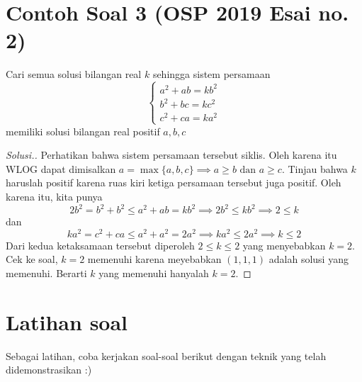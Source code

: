 \documentclass[12pt]{scrartcl}
\begin{document}
\section{Contoh Soal 3 (OSP 2019 Esai no. 2)}
\begin{example*}
\item  Cari semua solusi bilangan real $k$ sehingga sistem persamaan\\[-10pt] 
		$$\begin{cases}
			a^2+ab=kb^2 \\
			b^2+bc=kc^2 \\
			c^2+ca=ka^2
		\end{cases}$$
memiliki solusi bilangan real positif $a,b,c$
\end{example*}
\begin{proof}[Solusi.] Perhatikan bahwa sistem persamaan tersebut siklis. Oleh karena itu WLOG dapat dimisalkan $a = \max \{a,b,c\} \implies a \ge b \text{ dan } a \ge c$. Tinjau bahwa $k$ haruslah positif karena ruas kiri ketiga persamaan tersebut juga positif. Oleh karena itu, kita punya
$$2b^2 = b^2+b^2 \le a^2+ab = kb^2 \implies 2b^2 \le kb^2 \implies 2 \le k$$
dan 
$$ka^2 = c^2 + ca \le a^2 + a^2 = 2a^2 \implies ka^2 \le 2a^2 \implies k \le 2$$
Dari kedua ketaksamaan tersebut diperoleh $2 \le k \le 2$ yang menyebabkan $k=2$.
Cek ke soal, $k=2$ memenuhi karena meyebabkan $(1,1,1)$ adalah solusi yang memenuhi. Berarti $k$ yang memenuhi hanyalah $k=2$.


\end{proof}

\section{Latihan soal}
Sebagai latihan, coba kerjakan soal-soal berikut dengan teknik yang telah didemonstrasikan :)
\end{document}
